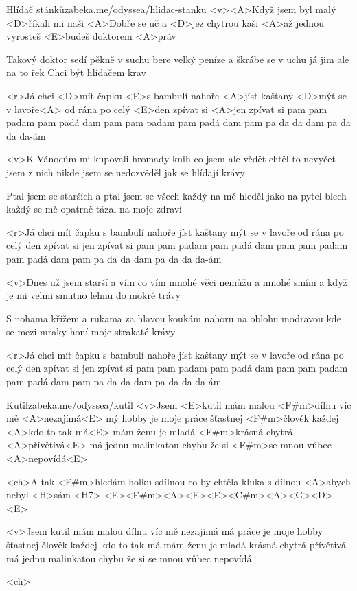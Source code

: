 \begin{song}{22}{Hlídač stánků}{zabeka.me/odyssea/hlidac-stanku}
	<v><A>Když jsem byl malý <D>říkali mi naši
	<A>Dobře se uč a <D>jez chytrou kaši
	<A>až jednou vyrosteš <E>budeš doktorem <A>práv

	Takový doktor sedí pěkně v suchu
	bere velký peníze a škrábe se v uchu
	já jim ale na to řek Chci být hlídačem krav

	<r>Já chci <D>mít čapku <E>s bambulí nahoře
	<A>jíst kaštany <D>mýt se v lavoře<A>
	od rána po celý <E>den
	zpívat si <A>jen zpívat si
	pam pam padam pam padá dam
	pam pam padam pam padá dam
	pam pa da da dam pa da da da-ám

	<v>K Vánocům mi kupovali hromady knih
	co jsem ale vědět chtěl to nevyčet jsem z nich
	nikde jsem se nedozvěděl jak se hlídají krávy

	Ptal jsem se starších a ptal jsem se všech
	každý na mě hleděl jako na pytel blech
	každý se mě opatrně tázal na moje zdraví

	<r>Já chci mít čapku s bambulí nahoře
	jíst kaštany mýt se v lavoře
	od rána po celý den
	zpívat si jen zpívat si
	pam pam padam pam padá dam
	pam pam padam pam padá dam
	pam pa da da dam pa da da da-ám

	<v>Dnes už jsem starší a vím co vím
	mnohé věci nemůžu a mnohé smím
	a když je mi velmi smutno lehnu do mokré trávy

	S nohama křížem a rukama za hlavou
	koukám nahoru na oblohu modravou
	kde se mezi mraky honí moje strakaté krávy

	<r>Já chci mít čapku s bambulí nahoře
	jíst kaštany mýt se v lavoře
	od rána po celý den
	zpívat si jen zpívat si
	pam pam padam pam padá dam
	pam pam padam pam padá dam
	pam pa da da dam pa da da da-ám
\end{song}
\begin{song}[Chinaski]{23}{Kutil}{zabeka.me/odyssea/kutil}
	<v>Jsem <E>kutil
	mám malou <F#m>dílnu víc mě <A>nezajímá<E>
	mý hobby je moje práce
	šťastnej <F#m>člověk každej <A>kdo to tak má<E>
	mám ženu
	je mladá <F#m>krásná chytrá <A>přívětivá<E>
	má jednu malinkatou chybu
	že si <F#m>se mnou vůbec <A>nepovídá<E>

	<ch>A tak <F#m>hledám holku sdílnou
	co by chtěla kluka s dílnou
	<A>abych nebyl <H>sám <H7>
	<E><F#m><A><E><E><C#m><A><G><D><E>

	<v>Jsem kutil
	mám malou dílnu víc mě nezajímá
	má práce je moje hobby
	šťastnej člověk každej kdo to tak má
	mám ženu
	je mladá krásná chytrá přívětivá
	má jednu malinkatou chybu
	že si se mnou vůbec nepovídá

	<ch>
\end{song}
